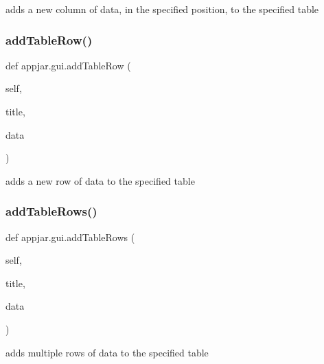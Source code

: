 \begin{DoxyVerb}adds a new column of data, in the specified position, to the specified table \end{DoxyVerb}
 \mbox{\label{classappjar_1_1gui_a73cc15fc34a5262a2236aba1b65e7d4c}} 
\subsubsection{\texorpdfstring{add\+Table\+Row()}{addTableRow()}}
{\footnotesize\ttfamily def appjar.\+gui.\+add\+Table\+Row (\begin{DoxyParamCaption}\item[{}]{self,  }\item[{}]{title,  }\item[{}]{data }\end{DoxyParamCaption})}

\begin{DoxyVerb}adds a new row of data to the specified table \end{DoxyVerb}
 \mbox{\label{classappjar_1_1gui_ad21de28837a221a0cf6667f4d5d6361f}} 
\subsubsection{\texorpdfstring{add\+Table\+Rows()}{addTableRows()}}
{\footnotesize\ttfamily def appjar.\+gui.\+add\+Table\+Rows (\begin{DoxyParamCaption}\item[{}]{self,  }\item[{}]{title,  }\item[{}]{data }\end{DoxyParamCaption})}

\begin{DoxyVerb}adds multiple rows of data to the specified table \end{DoxyVerb}
 \mbox{\label{classappjar_1_1gui_aa969d708e48ef4204432e51e41bd564a}} 
